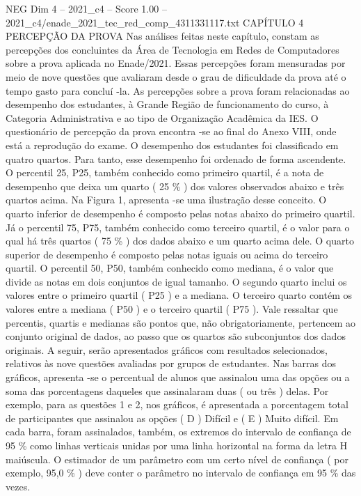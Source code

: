 \begin{textsample}{NEG Dim 4 – 2021\_c4 – Score 1.00 – 2021\_c4/enade\_2021\_tec\_red\_comp\_4311331117.txt}  \label{ex:f4_neg_223}
CAPÍTULO 4 PERCEPÇÃO DA PROVA Nas análises feitas neste capítulo, constam as percepções dos concluintes da Área de Tecnologia em Redes de Computadores sobre a prova aplicada no Enade/2021.
Essas percepções foram mensuradas por meio de nove questões que avaliaram desde o grau de dificuldade da prova até o tempo gasto para concluí -la.
As percepções sobre a prova foram relacionadas ao desempenho dos estudantes, à Grande Região de funcionamento do curso, à Categoria Administrativa e ao tipo de Organização Acadêmica da IES.
O questionário de percepção da prova encontra -se ao final do Anexo VIII, onde está a reprodução do exame.
O desempenho dos estudantes foi classificado em quatro quartos.
Para tanto, esse desempenho foi ordenado de forma ascendente.
O percentil 25, P25, também conhecido como primeiro quartil, é a nota de desempenho que deixa um quarto ( 25 \% ) dos valores observados abaixo e três quartos acima.
Na Figura 1, apresenta -se uma ilustração desse conceito.
O quarto inferior de desempenho é composto pelas notas abaixo do primeiro quartil.
Já o percentil 75, P75, também conhecido como terceiro quartil, é o valor para o qual há três quartos ( 75 \% ) dos dados abaixo e um quarto acima dele.
O quarto superior de desempenho é composto pelas notas iguais ou acima do terceiro quartil.
O percentil 50, P50, também conhecido como mediana, é o valor que divide as notas em dois conjuntos de igual tamanho.
O segundo quarto inclui os valores entre o primeiro quartil ( P25 ) e a mediana.
O terceiro quarto contém os valores entre a mediana ( P50 ) e o terceiro quartil ( P75 ).
Vale ressaltar que percentis, quartis e medianas são pontos que, não obrigatoriamente, pertencem ao conjunto original de dados, ao passo que os quartos são subconjuntos dos dados originais.
A seguir, serão apresentados gráficos com resultados selecionados, relativos às nove questões avaliadas por grupos de estudantes.
Nas barras dos gráficos, apresenta -se o percentual de alunos que assinalou uma das opções ou a soma das porcentagens daqueles que assinalaram duas ( ou três ) delas.
Por exemplo, para as questões 1 e 2, nos gráficos, é apresentada a porcentagem total de participantes que assinalou as opções ( D ) Difícil e ( E ) Muito difícil.
Em cada barra, foram assinalados, também, os extremos do intervalo de confiança de 95 \% como linhas verticais unidas por uma linha horizontal na forma da letra H maiúscula.
O estimador de um parâmetro com um certo nível de confiança ( por exemplo, 95,0 \% ) deve conter o parâmetro no intervalo de confiança em 95 \% das vezes.

\end{textsample}
